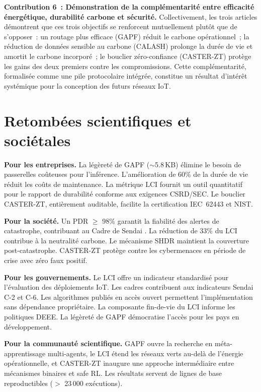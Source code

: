 \textbf{Contribution 6~: Démonstration de la complémentarité entre efficacité énergétique, durabilité carbone et sécurité.}
Collectivement, les trois articles démontrent que ces trois objectifs se renforcent mutuellement plutôt que de s'opposer~: un routage plus efficace (GAPF) réduit le carbone opérationnel~; la réduction de données sensible au carbone (CALASH) prolonge la durée de vie et amortit le carbone incorporé~; le bouclier zéro-confiance (CASTER-ZT) protège les gains des deux premiers contre les compromissions. Cette complémentarité, formalisée comme une pile protocolaire intégrée, constitue un résultat d'intérêt systémique pour la conception des futurs réseaux IoT.


\section{Retombées scientifiques et sociétales}\label{sec:concl-retombees}

\textbf{Pour les entreprises.}
La légèreté de GAPF ($\sim$5.8\,KB) élimine le besoin de passerelles coûteuses pour l'inférence. L'amélioration de 60\% de la durée de vie réduit les coûts de maintenance. La métrique LCI fournit un outil quantitatif pour le rapport de durabilité conforme aux exigences CSRD/SEC. Le bouclier CASTER-ZT, entièrement auditable, facilite la certification IEC~62443 et NIST.

\textbf{Pour la société.}
Un PDR $\geq$ 98\% garantit la fiabilité des alertes de catastrophe, contribuant au Cadre de Sendai \cite{UNDRR2015Sendai}. La réduction de 33\% du LCI contribue à la neutralité carbone. Le mécanisme SHDR maintient la couverture post-catastrophe. CASTER-ZT protège contre les cybermenaces en période de crise avec zéro faux positif.

\textbf{Pour les gouvernements.}
Le LCI offre un indicateur standardisé pour l'évaluation des déploiements IoT. Les cadres contribuent aux indicateurs Sendai C-2 et C-6. Les algorithmes publiés en accès ouvert permettent l'implémentation sans dépendance propriétaire. La composante fin-de-vie du LCI informe les politiques DEEE. La légèreté de GAPF démocratise l'accès pour les pays en développement.

\textbf{Pour la communauté scientifique.}
GAPF ouvre la recherche en méta-apprentissage multi-agents, le LCI étend les réseaux verts au-delà de l'énergie opérationnelle, et CASTER-ZT inaugure une approche intermédiaire entre mécanismes binaires et safe RL. Les résultats servent de lignes de base reproductibles ($>$ 23\,000 exécutions).


